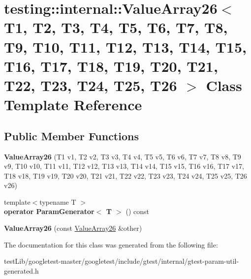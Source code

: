 \hypertarget{classtesting_1_1internal_1_1ValueArray26}{}\section{testing\+:\+:internal\+:\+:Value\+Array26$<$ T1, T2, T3, T4, T5, T6, T7, T8, T9, T10, T11, T12, T13, T14, T15, T16, T17, T18, T19, T20, T21, T22, T23, T24, T25, T26 $>$ Class Template Reference}
\label{classtesting_1_1internal_1_1ValueArray26}
\subsection*{Public Member Functions}
\begin{DoxyCompactItemize}
\item 
\mbox{\label{classtesting_1_1internal_1_1ValueArray26_aec16334223f12b85aa7b6c260ac5567b}} 
{\bfseries Value\+Array26} (T1 v1, T2 v2, T3 v3, T4 v4, T5 v5, T6 v6, T7 v7, T8 v8, T9 v9, T10 v10, T11 v11, T12 v12, T13 v13, T14 v14, T15 v15, T16 v16, T17 v17, T18 v18, T19 v19, T20 v20, T21 v21, T22 v22, T23 v23, T24 v24, T25 v25, T26 v26)
\item 
\mbox{\label{classtesting_1_1internal_1_1ValueArray26_adc70c82cb08c26c952e2d41b23844a72}} 
{\footnotesize template$<$typename T $>$ }\\{\bfseries operator Param\+Generator$<$ T $>$} () const
\item 
\mbox{\label{classtesting_1_1internal_1_1ValueArray26_a7a19431c15974a7aa81143a668ed035e}} 
{\bfseries Value\+Array26} (const \hyperlink{classtesting_1_1internal_1_1ValueArray26}{Value\+Array26} \&other)
\end{DoxyCompactItemize}


The documentation for this class was generated from the following file\+:\begin{DoxyCompactItemize}
\item 
test\+Lib/googletest-\/master/googletest/include/gtest/internal/gtest-\/param-\/util-\/generated.\+h\end{DoxyCompactItemize}
